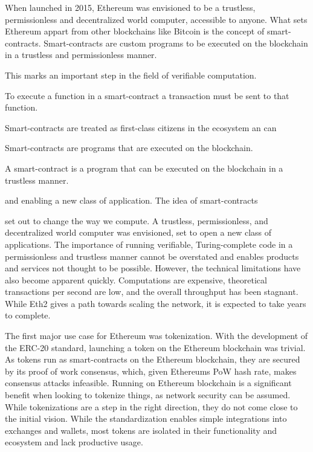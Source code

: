 \documentclass[../../thesis.tex]{subfiles}
\begin{document}
When launched in 2015, Ethereum \cite{wood2014ethereum} was envisioned to be a trustless, permissionless and decentralized world computer, accessible to anyone. What sets Ethereum appart from other blockchains like Bitcoin \cite{nakamoto2009bitcoin} is the concept of smart-contracts. Smart-contracts are custom programs to be executed on the blockchain in a trustless and permissionless manner. 

This marks an important step in the field of verifiable computation. 

To execute a function in a smart-contract a transaction must be sent to that function. 




Smart-contracts are treated as first-class citizens in the ecosystem an can 


Smart-contracts are programs that are executed on the blockchain. 

A smart-contract is a program that can be executed on the blockchain in a trustless manner. 


and enabling a new class of application. The idea of smart-contracts 


set out to change the way we compute. A trustless, permissionless, and decentralized world computer was envisioned, set to open a new class of applications. The importance of running verifiable, Turing-complete code in a permissionless and trustless manner cannot be overstated and enables products and services not thought to be possible. However, the technical limitations have also become apparent quickly. Computations are expensive, theoretical transactions per second are low, and the overall throughput has been stagnant. While Eth2 gives a path towards scaling the network, it is expected to take years to complete. 

The first major use case for Ethereum was tokenization. With the development of the ERC-20 standard, launching a token on the Ethereum blockchain was trivial. As tokens run as smart-contracts on the Ethereum blockchain, they are secured by its proof of work consensus, which, given Ethereums PoW hash rate, makes consensus attacks infeasible. Running on Ethereum blockchain is a significant benefit when looking to tokenize things, as network security can be assumed. While tokenizations are a step in the right direction, they do not come close to the initial vision. While the standardization enables simple integrations into exchanges and wallets, most tokens are isolated in their functionality and ecosystem and lack productive usage.
\end{document}
